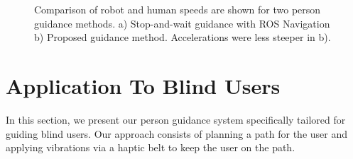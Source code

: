 \begin{figure}[ht!]
\centering
%
        
    \caption{%
	Comparison of robot and human speeds are shown for two person guidance methods. a) Stop-and-wait guidance with ROS Navigation b) Proposed guidance method. Accelerations were less steeper in b).
     }%
   \label{fig:guidance_performance_graph}
\end{figure}




\section{Application To Blind Users}
\label{sec:guidance_blind_users}

In this section, we present our person guidance system specifically tailored for guiding blind users. Our approach consists of planning a path for the user and applying vibrations via a haptic belt to keep the user on the path.

